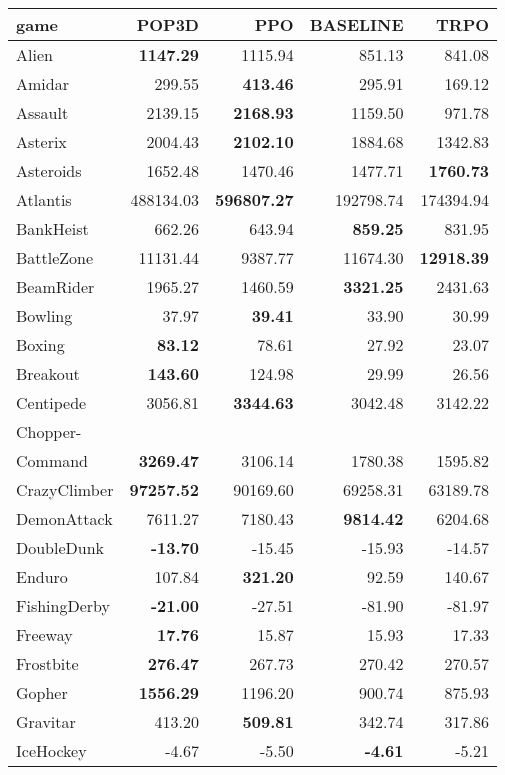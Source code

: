 \documentclass{article}
\begin{document}
\begin{table*}
	\begin{center}
		\begin{tabular}{lrrrr}
			\toprule
			game  & POP3D& PPO  & BASELINE & TRPO\\
			\midrule
			Alien &\textbf{1147.29}& 1115.94& 851.13& 841.08\\
			Amidar & 299.55&\textbf{413.46}& 295.91& 169.12\\
			Assault & 2139.15&\textbf{2168.93}& 1159.50& 971.78\\
			Asterix & 2004.43&\textbf{2102.10}& 1884.68& 1342.83\\
			Asteroids & 1652.48& 1470.46& 1477.71&\textbf{1760.73}\\
			Atlantis & 488134.03&\textbf{596807.27}& 192798.74& 174394.94\\
			BankHeist  & 662.26& 643.94&\textbf{859.25}& 831.95\\
			BattleZone & 11131.44& 9387.77& 11674.30&\textbf{12918.39}\\
			BeamRider & 1965.27& 1460.59&\textbf{3321.25}& 2431.63\\
			Bowling & 37.97&\textbf{39.41}& 33.90& 30.99\\
			Boxing  &\textbf{83.12}& 78.61& 27.92& 23.07\\
			Breakout &\textbf{143.60}& 124.98& 29.99& 26.56\\
			Centipede & 3056.81&\textbf{3344.63}& 3042.48& 3142.22\\
			Chopper-\\
			Command  &\textbf{3269.47}& 3106.14& 1780.38& 1595.82\\
			CrazyClimber &\textbf{97257.52}& 90169.60& 69258.31& 63189.78\\
			DemonAttack & 7611.27& 7180.43&\textbf{9814.42}& 6204.68\\
			DoubleDunk &\textbf{-13.70}& -15.45& -15.93& -14.57\\
			Enduro & 107.84&\textbf{321.20}& 92.59& 140.67\\
			FishingDerby &\textbf{-21.00}& -27.51& -81.90& -81.97\\
			Freeway &\textbf{17.76}& 15.87& 15.93& 17.33\\
			Frostbite &\textbf{276.47}& 267.73& 270.42& 270.57\\
			Gopher &\textbf{1556.29}& 1196.20& 900.74& 875.93\\
			Gravitar & 413.20&\textbf{509.81}& 342.74& 317.86\\
			IceHockey& -4.67& -5.50&\textbf{-4.61}& -5.21\\

\end{tabular}
\end{center}
\end{table*}
\end{document}
